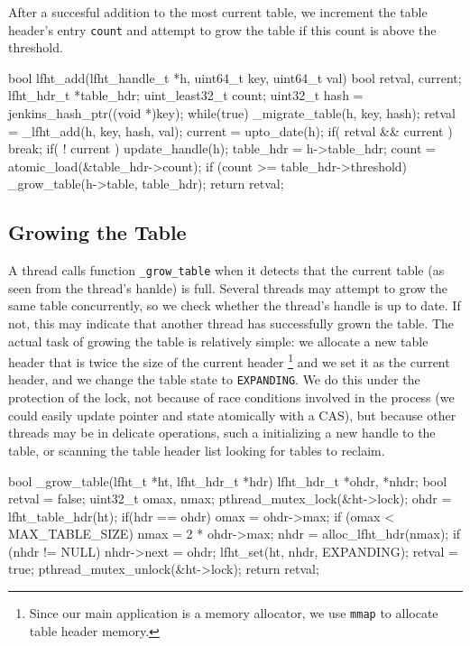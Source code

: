 After a succesful addition to the most current table, we increment the
table header's entry \texttt{count} and attempt to grow the table if
this count is above the threshold.

\begin{center}
\begin{clisting}
bool lfht_add(lfht_handle_t *h, uint64_t key, uint64_t val){
  bool retval, current;
  lfht_hdr_t *table_hdr;
  uint_least32_t count;
  uint32_t hash = jenkins_hash_ptr((void *)key);
  while(true){
    _migrate_table(h, key, hash);
    retval = _lfht_add(h, key, hash, val);
    current = upto_date(h);
    if( retval && current ){ break; }
    if( ! current ){ update_handle(h); }
  }
  table_hdr = h->table_hdr;
  count = atomic_load(&table_hdr->count);
  if (count >= table_hdr->threshold){
    _grow_table(h->table, table_hdr);
  }
  return retval;
}

\end{clisting}
\end{center}


\subsection{Growing the Table}

A thread calls function \texttt{\_grow\_table} when it detects that
the current table (as seen from the thread's hanlde) is full. Several
threads may attempt to grow the same table concurrently, so we check
whether the thread's handle is up to date. If not, this may indicate
that another thread has successfully grown the table.
The actual task of growing the table is relatively simple:  we allocate
a new table header that is twice the size of the current header 
\footnote{Since our main application is a memory allocator, we use
  \texttt{mmap} to allocate table header memory.}  and we set it as
the current header, and we change the table state to
\texttt{EXPANDING}.  We do this under the protection of the lock, not
because of race conditions involved in the process (we
could easily update pointer and state atomically with a CAS), but because other
threads may be in delicate operations, such a initializing a new
handle to the table, or scanning the table header list looking
for tables to reclaim.


\begin{center}
\begin{clisting}
bool _grow_table(lfht_t *ht,  lfht_hdr_t *hdr){
  lfht_hdr_t *ohdr, *nhdr;
  bool retval = false;
  uint32_t omax, nmax;
  pthread_mutex_lock(&ht->lock);
  ohdr = lfht_table_hdr(ht);
  if(hdr == ohdr){
    omax = ohdr->max;
    if (omax < MAX_TABLE_SIZE) {
      nmax = 2 * ohdr->max;
      nhdr  = alloc_lfht_hdr(nmax);
      if (nhdr != NULL){
	nhdr->next = ohdr;
	lfht_set(ht, nhdr, EXPANDING);
	retval = true;
      }
    }
  }
  pthread_mutex_unlock(&ht->lock);
  return retval;
}

\end{clisting}
\end{center}


